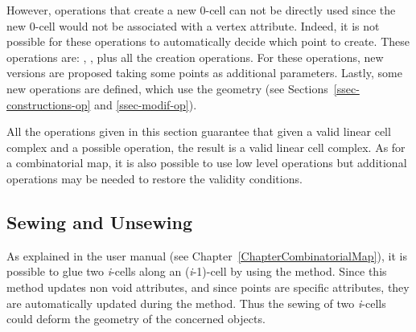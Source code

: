 However, operations that create a new 0-cell can not be directly used
since the new 0-cell would not be associated with a vertex
attribute. Indeed, it is not possible for these operations to
automatically decide which point to create. These operations are:
, 
, plus all the creation
operations. For these operations, new versions are proposed taking
some points as additional parameters.  Lastly, some new operations are
defined, which use the geometry (see Sections~\ref{ssec-constructions-op} and
\ref{ssec-modif-op}).

All the operations given in this section guarantee that given a valid
linear cell complex and a possible operation, the result is a valid
linear cell complex. As for a combinatorial map, it is also possible
to use low level operations but additional operations may be needed to
restore the validity conditions.

\subsection{Sewing and Unsewing \label{ssec-lcc-link-darts}}

As explained in the  user manual (see
Chapter~\ref{ChapterCombinatorialMap}), it is possible to glue two
\emph{i}-cells along an (\emph{i}-1)-cell by using the 
method. Since this method updates non void attributes, and since
points are specific attributes, they are automatically updated during
the  method. Thus the sewing of two \emph{i}-cells could
deform the geometry of the concerned objects.

